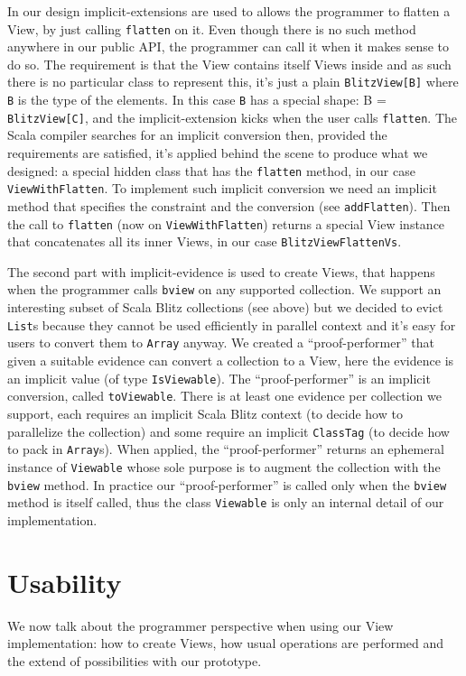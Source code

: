 \documentclass[a4paper,12pt,twocolumn]{article}
\begin{document}
In our design implicit-extensions are used to allows the programmer to flatten a View, by just calling \verb|flatten| on it.
Even though there is no such method anywhere in our public API, the programmer can call it when it makes sense to do so.
The requirement is that the View contains itself Views inside and as such there is no particular class to represent this, it's just a plain \verb|BlitzView[B]| where \verb|B| is the type of the elements.
In this case \verb|B| has a special shape: B = \verb|BlitzView[C]|, and the implicit-extension kicks when the user calls \verb|flatten|.
The Scala compiler searches for an implicit conversion then, provided the requirements are satisfied, it's applied behind the scene to produce what we designed: a special hidden class that has the \verb|flatten| method, in our case \verb|ViewWithFlatten|.
To implement such implicit conversion we need an implicit method that specifies the constraint and the conversion (see \verb|addFlatten|).
Then the call to \verb|flatten| (now on \verb|ViewWithFlatten|) returns a special View instance that concatenates all its inner Views, in our case \verb|BlitzViewFlattenVs|.

The second part with implicit-evidence is used to create Views, that happens when the programmer calls \verb|bview| on any supported collection.
We support an interesting subset of Scala Blitz collections (see above) but we decided to evict \verb|List|s because they cannot be used efficiently in parallel context and it's easy for users to convert them to \verb|Array| anyway.
We created a ``proof-performer'' that given a suitable evidence can convert a collection to a View, here the evidence is an implicit value (of type \verb|IsViewable|).
The ``proof-performer'' is an implicit conversion, called \verb|toViewable|.
There is at least one evidence per collection we support, each requires an implicit Scala Blitz context (to decide how to parallelize the collection) and some require an implicit \verb|ClassTag| (to decide how to pack in \verb|Array|s).
When applied, the ``proof-performer'' returns an ephemeral instance of \verb|Viewable| whose sole purpose is to augment the collection with the \verb|bview| method.
In practice our ``proof-performer'' is called only when the \verb|bview| method is itself called, thus the class \verb|Viewable| is only an internal detail of our implementation.

\section{Usability}
We now talk about the programmer perspective when using our View implementation: how to create Views, how usual operations are performed and the extend of possibilities with our prototype.
\end{document}
